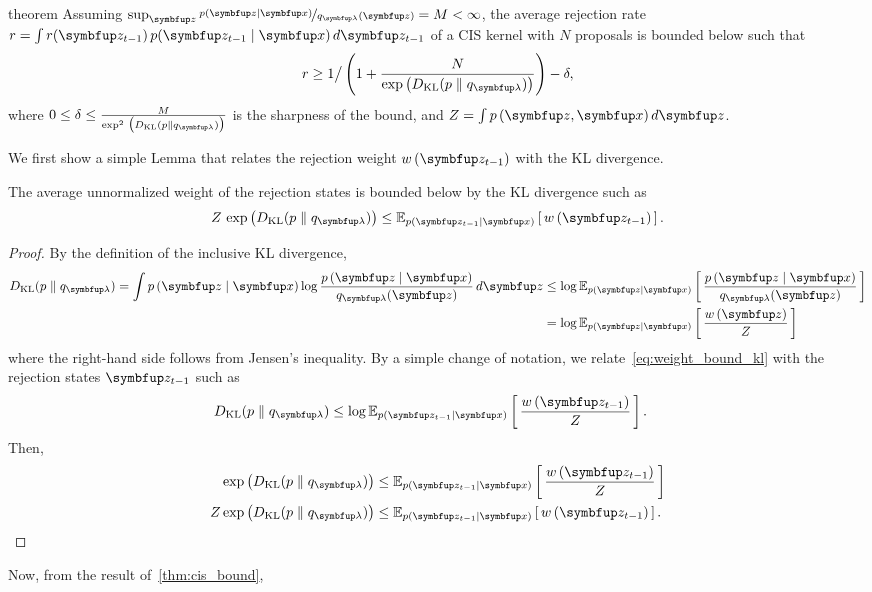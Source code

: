 
\begin{theoremEnd}[]{theorem}\label{thm:cis_bound_kl}
  Assuming \(\sup_{\vz} \nicefrac{p(\vz\mid\vx)}{q_{\vlambda}(\vz)} = M < \infty\), the average rejection rate \(r = \int r(\vz_{t-1}) \, p(\vz_{t-1}\mid\vx) \, d\vz_{t-1} \) of a CIS kernel with \(N\) proposals is bounded below such that
  \[
  r \geq 1 \big/ 
    \left(1 + \frac{N}{
      \exp\big(\DKL{p}{q_{\vlambda}}\big)
    }
    \right) - \delta,
  \]
  where \(
  0 \leq \delta \leq \frac{M}{\exp^2\,\big( \DKL{p}{q_{\vlambda}}\big) }
  \)
  is the sharpness of the bound, and \(Z = \int p\,(\vz,\vx) \, d\vz\).
\end{theoremEnd}
\begin{proofEnd}
  We first show a simple Lemma that relates the rejection weight \(w\,(\vz_{t-1})\) with the KL divergence.
  \begin{framedlemma}\label{thm:rej_kl_bound}
    The average unnormalized weight of the rejection states is bounded below by the KL divergence such as
    \[
    Z\,\exp\big(\DKL{p}{q_{\vlambda}}\big) \leq \Esub{p(\vz_{t-1}\mid\vx)}{w\,(\vz_{t-1})}.
    \]
  \begin{proof}
    By the definition of the inclusive KL divergence,
    \begin{align}
      \DKL{p}{q_{\vlambda}} = \int p\,(\vz\mid\vx) \log \frac{p\,(\vz\mid\vx)}{q_{\vlambda}(\vz)} \, d\vz
      &\leq \log \Esub{p(\vz\mid\vx)}{\frac{p\,(\vz\mid\vx)}{q_{\vlambda}(\vz)}} \\
      &= \log \Esub{p(\vz\mid\vx)}{ \frac{w\,(\vz)}{Z} } \label{eq:weight_bound_kl}
    \end{align}
    where the right-hand side follows from Jensen's inequality.
    By a simple change of notation, we relate~\eqref{eq:weight_bound_kl} with the rejection states \(\vz_{t-1}\) such as
    \begin{align}
      \DKL{p}{q_{\vlambda}} &\leq \log \Esub{p(\vz_{t-1}\mid\vx)}{\frac{w\,(\vz_{t-1})}{Z}}.
    \end{align}
    Then,
    \begin{align}
      \exp\big(\DKL{p}{q_{\vlambda}}\big) &\leq \Esub{p(\vz_{t-1}\mid\vx)}{
        \frac{w\,(\vz_{t-1})}{Z}} \\
      Z \exp\big(\DKL{p}{q_{\vlambda}}\big) &\leq \Esub{p(\vz_{t-1}\mid\vx)}{w\,(\vz_{t-1})}.
    \end{align}
  \end{proof}
  \end{framedlemma}
  Now, from the result of~\cref{thm:cis_bound},

\end{proofEnd}
